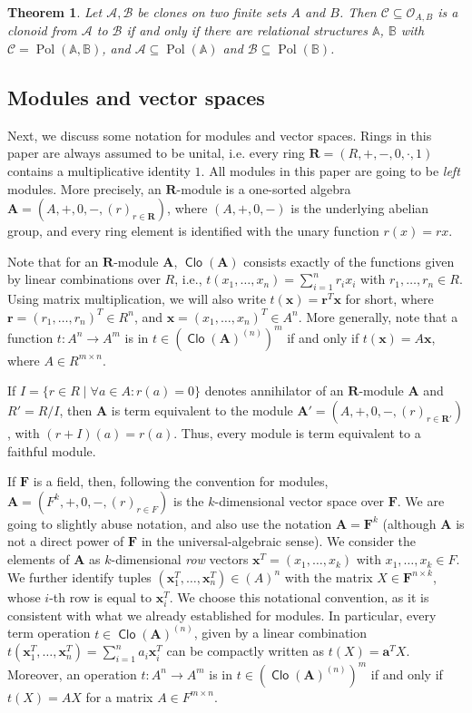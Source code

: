 \documentclass[11pt]{amsart}
\theoremstyle{plain}
\newtheorem{theorem}[thm]{Theorem}
\theoremstyle{definition}
\newcommand{\F}{{\mathbf F}}
\DeclareMathOperator{\Pol}{Pol}
\newcommand{\alg}[1]{\mathbf{#1}}
\newcommand{\clone}[1]{\mathcal{#1}}
\newcommand{\clonoid}[1]{\mathcal{#1}}
\newcommand{\clodC}{\clonoid{C}}
\newcommand{\clodO}{\clonoid{O}}
\newcommand{\algA}{\alg{A}}
\newcommand{\algR}{\alg{R}}
\newcommand{\cloA}{\clone{A}}
\newcommand{\cloB}{\clone{B}}
\renewcommand\vec{\mathbf}
\newcommand{\va}{\vec{a}}
\newcommand{\vr}{\vec{r}}
\newcommand{\vx}{\vec{x}}
\DeclareMathOperator{\Clo}{\mathsf{Clo}}
\begin{document}
\begin{theorem} \label{theorem:CF}
Let $\cloA, \cloB$ be clones on two finite sets $A$ and $B$. Then $\clodC \subseteq \clodO_{A,B}$ is a clonoid from $\cloA$ to $\cloB$ if and only if there are relational structures $\mathbb A$, $\mathbb B$ with  $\clodC = \Pol(\mathbb A, \mathbb B)$, and $\cloA \subseteq \Pol(\mathbb A)$ and $\cloB \subseteq \Pol(\mathbb B)$.
\end{theorem}


\subsection{Modules and vector spaces}
Next, we discuss some notation for modules and vector spaces. Rings in this paper are always assumed to be unital, i.e. every ring $\algR = (R,+,-,0,\cdot, 1)$ contains a multiplicative identity $1$. All modules in this paper are going to be \emph{left} modules. More precisely, an $\algR$-module is a one-sorted algebra $\algA = (A,+,0,-,(r)_{r \in \algR})$, where $(A,+,0,-)$ is the underlying abelian group, and every ring element is identified with the unary function $r(x) = rx$.

Note that for an $\mathbf R$-module $\algA$, $\Clo(\algA)$ consists exactly of the functions given by linear combinations over $R$, i.e., $t(x_1,\ldots,x_n) = \sum_{i=1}^n r_i x_i$ with $r_1,\ldots,r_n \in R$. Using matrix multiplication, we will also write $t(\vx) = \vr^T \vx$ for short, where $\vr = (r_1,\ldots,r_n)^T \in R^n$, and $\vx = (x_1,\ldots,x_n)^T \in A^n$. More generally, note that a function $t\colon A^n \to A^m$ is in $t \in (\Clo(\mathbf A)^{(n)})^m$ if and only if $t(\vx) = A \vx$, where $A \in R^{m\times n}$.

If $I = \{ r\in R \mid \forall a \in A \colon r(a) = 0 \}$ denotes annihilator of an $\algR$-module $\algA$ and $R'=R/I$, then $\algA$ is term equivalent to the module $\algA' = (A,+,0,-,(r)_{r \in \algR'})$, with $(r+I)(a) = r(a)$. Thus, every module is term equivalent to a faithful module.

If $\mathbf F$ is a field, then, following the convention for modules, $\mathbf A = (F^k, +,0,-,(r)_{r \in F})$ is the $k$-dimensional vector space over $\mathbf F$. We are going to slightly abuse notation, and also use the notation $\algA = \F^k$ (although $\algA$ is not a direct power of $\F$ in the universal-algebraic sense). We consider the elements of $\algA$ as $k$-dimensional \emph{row} vectors $\vx^T = (x_1,\ldots,x_k)$ with $x_1,\ldots,x_k \in F$. We further identify tuples $(\vx_1^T,\ldots,\vx_n^T) \in (A)^n$ with the matrix $X \in \mathbf F^{n \times k}$, whose $i$-th row is equal to $\vx_i^T$. We choose this notational convention, as it is consistent with what we already established for modules. In particular, every term operation $t \in \Clo(\mathbf A)^{(n)}$, given by a linear combination $t(\vx_1^T,\ldots,\vx_n^T) = \sum_{i=1}^n a_i \vx_i^T$ can be compactly written as $t(X) = \va^T X$. Moreover, an operation $t\colon A^n \to A^m$ is in $t \in (\Clo(\mathbf A)^{(n)})^m$ if and only if $t(X) = AX$ for a matrix $A \in F^{m\times n}$.
\end{document}
